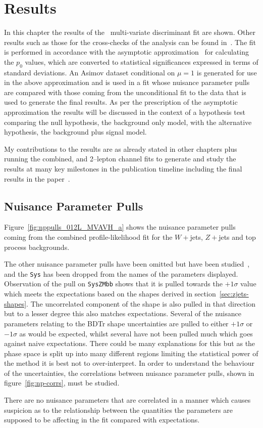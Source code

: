 \chapter{Results}%
\label{ch:results}
In this chapter the results of the \VHbb\ multi-variate discriminant fit are
shown. Other results such as those for the cross-checks of the analysis can be
found in~\cite{VHMainNote2019}. The fit is performed in accordance with the
asymptotic approximation~\cite{Cowan:2010js} for calculating the $p_0$ values,
which are converted to statistical significances expressed in terms of standard
deviations. An Asimov dataset conditional on $\mu=1$  is generated for use in
the above approximation and is used in a fit whose nuisance parameter pulls are
compared with those coming from the unconditional fit to the data that is used
to generate the final results. As per the prescription of the asymptotic
approximation the results will be discussed in the context of a hypothesis test
comparing the null hypothesis, the background only model, with the alternative
hypothesis, the background plus signal model.

My contributions to the results are as already stated in other chapters plus
running the combined, and 2--lepton channel fits to generate and study the
results at many key milestones in the publication timeline including the final
results in the paper~\cite{final-paper}.

\section{Nuisance Parameter Pulls}
Figure~\ref{fig:nppulls_012L_MVAVH_a} shows the nuisance parameter pulls coming
from the combined profile-likelihood fit for the $W+$jets, $Z+$jets and top
process backgrounds.

The other nuisance parameter pulls have been omitted but have been
studied~\cite{VHMainNote2019}, and the \texttt{Sys} has been dropped from the
names of the parameters displayed. Observation of the pull on \texttt{SysZMbb}
shows that it is pulled towards the $+1\sigma$ value which meets the
expectations based on the shapes derived in section~\ref{sec:zjets-shapes}. The
uncorrelated component of the shape is also pulled in that direction but to a
lesser degree this also matches expectations. Several of the nuisance parameters
relating to the BDTr shape uncertainties are pulled to either $+1\sigma$ or
$-1\sigma$ as would be expected, whilst several have not been pulled much which
goes against naive expectations. There could be many explanations for this but
as the phase space is split up into many different regions limiting the
statistical power of the method it is best not to over-interpret. In order to
understand the behaviour of the uncertainties, the correlations between nuisance
parameter pulls, shown in figure~\ref{fig:np-corrs}, must be studied.

There are no nuisance parameters that are correlated in a manner which causes
suspicion as to the relationship between the quantities the parameters are
supposed to be affecting in the fit compared with expectations.

